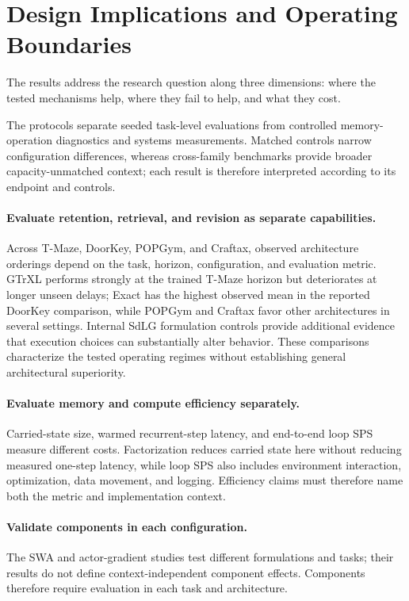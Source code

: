 \balance
\section{Design Implications and Operating Boundaries}
\label{sec:discussion}

The results address the research question along three dimensions: where the tested mechanisms help, where they fail to help, and what they cost.

The protocols separate seeded task-level evaluations from controlled memory-operation diagnostics and systems measurements. Matched controls narrow configuration differences, whereas cross-family benchmarks provide broader capacity-unmatched context; each result is therefore interpreted according to its endpoint and controls.

\paragraph{Evaluate retention, retrieval, and revision as separate capabilities.}
Across T-Maze, DoorKey, POPGym, and Craftax, observed architecture orderings depend on the task, horizon, configuration, and evaluation metric. GTrXL performs strongly at the trained T-Maze horizon but deteriorates at longer unseen delays; Exact has the highest observed mean in the reported DoorKey comparison, while POPGym and Craftax favor other architectures in several settings. Internal SdLG formulation controls provide additional evidence that execution choices can substantially alter behavior. These comparisons characterize the tested operating regimes without establishing general architectural superiority.

\paragraph{Evaluate memory and compute efficiency separately.}
Carried-state size, warmed recurrent-step latency, and end-to-end loop SPS measure different costs. Factorization reduces carried state here without reducing measured one-step latency, while loop SPS also includes environment interaction, optimization, data movement, and logging. Efficiency claims must therefore name both the metric and implementation context.

\paragraph{Validate components in each configuration.}
The SWA and actor-gradient studies test different formulations and tasks; their results do not define context-independent component effects. Components therefore require evaluation in each task and architecture.


